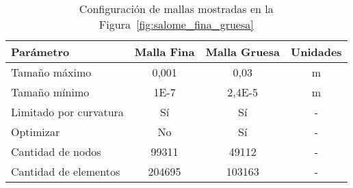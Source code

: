 \begin{table}[h!]
    \centering
    \begin{tabular}{lccc} \toprule
        Parámetro                & Malla Fina    & Malla Gruesa     & Unidades\\ \midrule
        Tamaño máximo            & 0,001         & 0,03             & m \\
        Tamaño mínimo            & 1E-7          & 2,4E-5           & m \\
        Limitado por curvatura   & Sí            & Sí               & - \\
        Optimizar                & No            & Sí               & - \\
        Cantidad de nodos        & 99311         & 49112            & - \\
        Cantidad de elementos    & 204695        & 103163           & - \\ \bottomrule
    \end{tabular}
    \caption{Configuración de mallas mostradas en la Figura~\ref{fig:salome_fina_gruesa}}
    \label{tab:salome_fina_gruesa}
\end{table}
